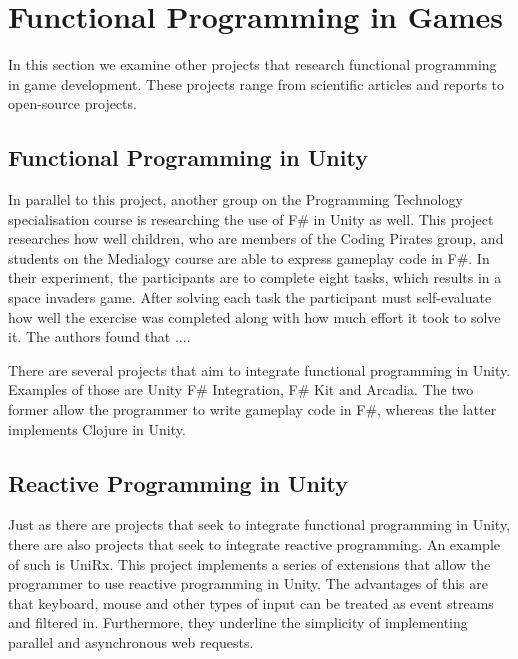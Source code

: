 \section{Functional Programming in Games}
In this section we examine other projects that research functional programming in game development. These projects range from scientific articles and reports to open-source projects.

\subsection{Functional Programming in Unity}
In parallel to this project, another group on the Programming Technology specialisation course is researching the use of F\# in Unity as well. This project researches how well children, who are members of the Coding Pirates group, and students on the Medialogy course are able to express gameplay code in F\#. In their experiment, the participants are to complete eight tasks, which results in a space invaders game. After solving each task the participant must self-evaluate how well the exercise was completed along with how much effort it took to solve it. The authors found that ...\cite{bolhuis2019gameplay}. 

There are several projects that aim to integrate functional programming in Unity. Examples of those are Unity F\# Integration\cite{fsharp2019plugin}, F\# Kit\cite{fsharp:kit} and Arcadia\cite{arcadia:github}. The two former allow the programmer to write gameplay code in F\#, whereas the latter implements Clojure in Unity.%

\subsection{Reactive Programming in Unity}
Just as there are projects that seek to integrate functional programming in Unity, there are also projects that seek to integrate reactive programming. An example of such is UniRx\cite{unirx}. This project implements a series of extensions that allow the programmer to use reactive programming in Unity. The advantages of this are that keyboard, mouse and other types of input can be treated as event streams and filtered in. Furthermore, they underline the simplicity of implementing parallel and asynchronous web requests\cite{unirx:github}.

